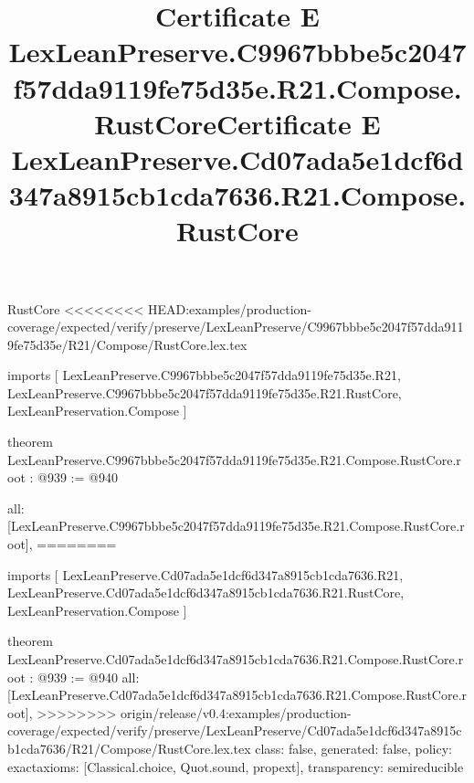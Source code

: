 \begin{lexlean}{RustCore}
<<<<<<<< HEAD:examples/production-coverage/expected/verify/preserve/LexLeanPreserve/C9967bbbe5c2047f57dda9119fe75d35e/R21/Compose/RustCore.lex.tex
\title{Certificate E LexLeanPreserve.C9967bbbe5c2047f57dda9119fe75d35e.R21.Compose.RustCore}
\begin{coremodule}
imports [
  LexLeanPreserve.C9967bbbe5c2047f57dda9119fe75d35e.R21,
  LexLeanPreserve.C9967bbbe5c2047f57dda9119fe75d35e.R21.RustCore,
  LexLeanPreservation.Compose
]

theorem LexLeanPreserve.C9967bbbe5c2047f57dda9119fe75d35e.R21.Compose.RustCore.root : @939 := @940 {
  all: [LexLeanPreserve.C9967bbbe5c2047f57dda9119fe75d35e.R21.Compose.RustCore.root],
========
\title{Certificate E LexLeanPreserve.Cd07ada5e1dcf6d347a8915cb1cda7636.R21.Compose.RustCore}
\begin{coremodule}
imports [
  LexLeanPreserve.Cd07ada5e1dcf6d347a8915cb1cda7636.R21,
  LexLeanPreserve.Cd07ada5e1dcf6d347a8915cb1cda7636.R21.RustCore,
  LexLeanPreservation.Compose
]

theorem LexLeanPreserve.Cd07ada5e1dcf6d347a8915cb1cda7636.R21.Compose.RustCore.root : @939 := @940 {
  all: [LexLeanPreserve.Cd07ada5e1dcf6d347a8915cb1cda7636.R21.Compose.RustCore.root],
>>>>>>>> origin/release/v0.4:examples/production-coverage/expected/verify/preserve/LexLeanPreserve/Cd07ada5e1dcf6d347a8915cb1cda7636/R21/Compose/RustCore.lex.tex
  class: false,
  generated: false,
  policy: exact{axioms: [Classical.choice, Quot.sound, propext]},
  transparency: semireducible
}


\end{coremodule}}
\end{coremodule}
\end{lexlean}
